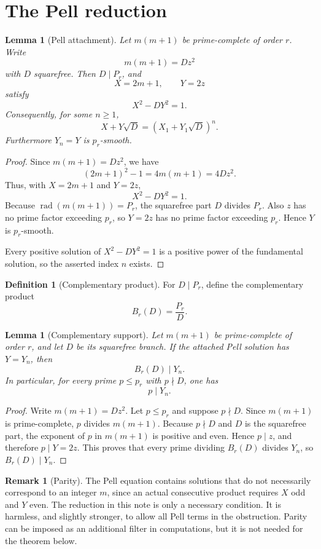 \documentclass[11pt]{article}
\newtheorem{lemma}[theorem]{Lemma}
\theoremstyle{definition}
\newtheorem{definition}[theorem]{Definition}
\newtheorem{remark}[theorem]{Remark}
\newcommand{\rad}{\operatorname{rad}}
\begin{document}
\section{The Pell reduction}

\begin{lemma}[Pell attachment]\label{lem:pell-attachment}
Let $m(m+1)$ be prime-complete of order $r$.  Write
\[
        m(m+1)=Dz^2
\]
with $D$ squarefree.  Then $D\mid P_r$, and
\[
        X=2m+1,\qquad Y=2z
\]
satisfy
\[
        X^2-DY^2=1.
\]
Consequently, for some $n\ge1$,
\[
        X+Y\sqrt D=(X_1+Y_1\sqrt D)^n.
\]
Furthermore $Y_n=Y$ is $p_r$-smooth.
\end{lemma}

\begin{proof}
Since $m(m+1)=Dz^2$, we have
\[
        (2m+1)^2-1=4m(m+1)=4Dz^2.
\]
Thus, with $X=2m+1$ and $Y=2z$,
\[
        X^2-DY^2=1.
\]
Because $\rad(m(m+1))=P_r$, the squarefree part $D$ divides $P_r$.  Also $z$ 
has no prime factor exceeding $p_r$, so $Y=2z$ has no prime factor exceeding 
$p_r$.  Hence $Y$ is $p_r$-smooth.

Every positive solution of $X^2-DY^2=1$ is a positive power of the fundamental 
solution, so the asserted index $n$ exists.
\end{proof}

\begin{definition}[Complementary product]
For $D\mid P_r$, define the complementary product
\[
        B_r(D)=\frac{P_r}{D}.
\]
\end{definition}

\begin{lemma}[Complementary support]\label{lem:complement-support}
Let $m(m+1)$ be prime-complete of order $r$, and let $D$ be its squarefree branch.  
If the attached Pell solution has $Y=Y_n$, then
\[
        B_r(D)\mid Y_n.
\]
In particular, for every prime $p\le p_r$ with $p\nmid D$, one has
\[
        p\mid Y_n.
\]
\end{lemma}

\begin{proof}
Write $m(m+1)=Dz^2$.  Let $p\le p_r$ and suppose $p\nmid D$.  Since $m(m+1)$ is 
prime-complete, $p$ divides $m(m+1)$.  Because $p\nmid D$ and $D$ is the squarefree 
part, the exponent of $p$ in $m(m+1)$ is positive and even.  Hence $p\mid z$, and 
therefore $p\mid Y=2z$.  This proves that every prime dividing $B_r(D)$ divides 
$Y_n$, so $B_r(D)\mid Y_n$.
\end{proof}

\begin{remark}[Parity]
The Pell equation contains solutions that do not necessarily correspond to an 
integer $m$, since an actual consecutive product requires $X$ odd and $Y$ even.  
The reduction in this note is only a necessary condition.  It is harmless, and 
slightly stronger, to allow all Pell terms in the obstruction.  Parity can be 
imposed as an additional filter in computations, but it is not needed for 
the theorem below.
\end{remark}
\end{document}
